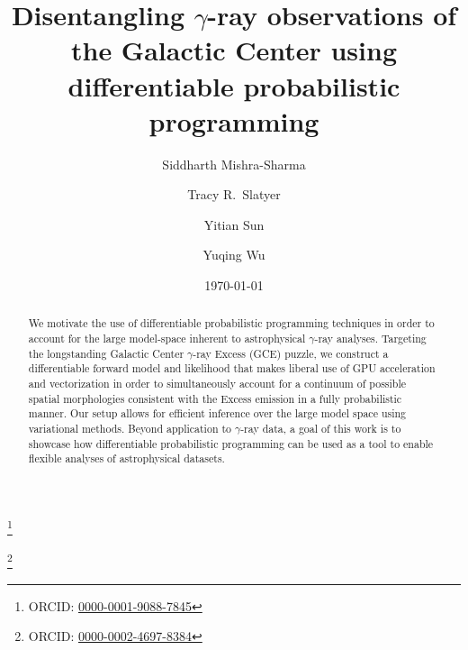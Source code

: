 \documentclass[prd,aps,10pt,nofootinbib,twocolumn,superscriptaddress,preprintnumbers,balancelastpage,longbibliography,floatfix]{revtex4-2}
\begin{document}

\title{Disentangling $\gamma$-ray observations of the Galactic Center using differentiable probabilistic programming}

\author{Siddharth Mishra-Sharma}
\thanks{ORCID: \href{https://orcid.org/0000-0001-9088-7845}{0000-0001-9088-7845}}

\author{Tracy R.~Slatyer}

\author{Yitian Sun}
\thanks{ORCID: \href{https://orcid.org/0000-0002-4697-8384}{0000-0002-4697-8384}}

\author{Yuqing Wu}

\date{\today}

\begin{abstract}
    We motivate the use of differentiable probabilistic programming techniques in order to account for the large model-space inherent to astrophysical $\gamma$-ray analyses. Targeting the longstanding Galactic Center $\gamma$-ray Excess (GCE) puzzle, we construct a differentiable forward model and likelihood that makes liberal use of GPU acceleration and vectorization in order to simultaneously account for a continuum of possible spatial morphologies consistent with the Excess emission in a fully probabilistic manner. Our setup allows for efficient inference over the large model space using variational methods. Beyond application to $\gamma$-ray data, a goal of this work is to showcase how differentiable probabilistic programming can be used as a tool to enable flexible analyses of astrophysical datasets.
\end{abstract}
\end{document}
